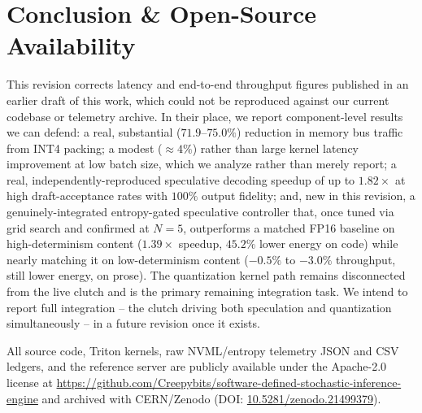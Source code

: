 \documentclass[10pt,journal,compsoc,twocolumn]{IEEEtran}
\begin{document}
\section{Conclusion \& Open-Source Availability}
This revision corrects latency and end-to-end throughput figures published in an earlier draft of this work, which could not be reproduced against our current codebase or telemetry archive. In their place, we report component-level results we can defend: a real, substantial ($71.9$--$75.0\%$) reduction in memory bus traffic from INT4 packing; a modest ($\approx 4\%$) rather than large kernel latency improvement at low batch size, which we analyze rather than merely report; a real, independently-reproduced speculative decoding speedup of up to $1.82\times$ at high draft-acceptance rates with $100\%$ output fidelity; and, new in this revision, a genuinely-integrated entropy-gated speculative controller that, once tuned via grid search and confirmed at $N{=}5$, outperforms a matched FP16 baseline on high-determinism content ($1.39\times$ speedup, $45.2\%$ lower energy on code) while nearly matching it on low-determinism content ($-0.5\%$ to $-3.0\%$ throughput, still lower energy, on prose). The quantization kernel path remains disconnected from the live clutch and is the primary remaining integration task. We intend to report full integration -- the clutch driving both speculation and quantization simultaneously -- in a future revision once it exists.

All source code, Triton kernels, raw NVML/entropy telemetry JSON and CSV ledgers, and the reference server are publicly available under the Apache-2.0 license at \url{https://github.com/Creepybits/software-defined-stochastic-inference-engine} and archived with CERN/Zenodo (DOI: \href{https://doi.org/10.5281/zenodo.21499379}{10.5281/zenodo.21499379}).

\balance
\end{document}
